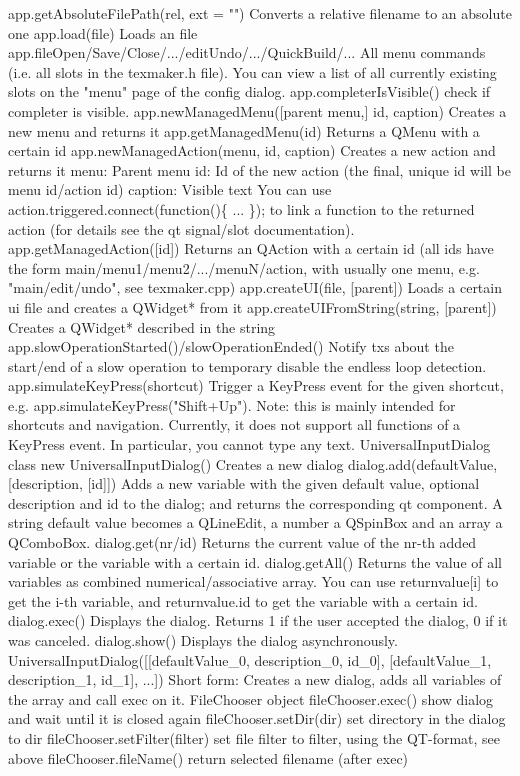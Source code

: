 \documentclass{article}
\begin{document}
	app.getAbsoluteFilePath(rel, ext = "")	Converts a relative filename to an absolute one
	app.load(file)	Loads an file
	app.fileOpen/Save/Close/.../editUndo/.../QuickBuild/...	All menu commands (i.e. all slots in the texmaker.h file). You can view a list of all currently existing slots on the "menu" page of the config dialog.
	app.completerIsVisible()	check if completer is visible.
	app.newManagedMenu([parent menu,] id, caption)	Creates a new menu and returns it
	app.getManagedMenu(id)	Returns a QMenu with a certain id
	app.newManagedAction(menu, id, caption)	Creates a new action and returns it
	menu: Parent menu
	id: Id of the new action (the final, unique id will be menu id/action id)
	caption: Visible text
	You can use action.triggered.connect(function()\{ ... \}); to link a function to the returned action (for details see the qt signal/slot documentation).
	app.getManagedAction([id])	Returns an QAction with a certain id (all ids have the form main/menu1/menu2/.../menuN/action, with usually one menu, e.g. "main/edit/undo", see texmaker.cpp)
	app.createUI(file, [parent])	Loads a certain ui file and creates a QWidget* from it
	app.createUIFromString(string, [parent])	Creates a QWidget* described in the string
	app.slowOperationStarted()/slowOperationEnded()	Notify txs about the start/end of a slow operation to temporary disable the endless loop detection.
	app.simulateKeyPress(shortcut)	Trigger a KeyPress event for the given shortcut, e.g. app.simulateKeyPress("Shift+Up"). Note: this is mainly intended for shortcuts and navigation. Currently, it does not support all functions of a KeyPress event. In particular, you cannot type any text.
	UniversalInputDialog class
	new UniversalInputDialog()	Creates a new dialog
	dialog.add(defaultValue, [description, [id]])	Adds a new variable with the given default value, optional description and id to the dialog; and returns the corresponding qt component.
	A string default value becomes a QLineEdit, a number a QSpinBox and an array a QComboBox.
	dialog.get(nr/id)	Returns the current value of the nr-th added variable or the variable with a certain id.
	dialog.getAll()	Returns the value of all variables as combined numerical/associative array. You can use returnvalue[i] to get the i-th variable, and returnvalue.id to get the variable with a certain id.
	dialog.exec()	Displays the dialog. Returns 1 if the user accepted the dialog, 0 if it was canceled.
	dialog.show()	Displays the dialog asynchronously.
	UniversalInputDialog([[defaultValue\_0, description\_0, id\_0], [defaultValue\_1, description\_1, id\_1], ...])	Short form: Creates a new dialog, adds all variables of the array and call exec on it.
	FileChooser object
	fileChooser.exec()	show dialog and wait until it is closed again
	fileChooser.setDir(dir)	set directory in the dialog to dir
	fileChooser.setFilter(filter)	set file filter to filter, using the QT-format, see above
	fileChooser.fileName()	return selected filename (after exec)
	
\end{document}
